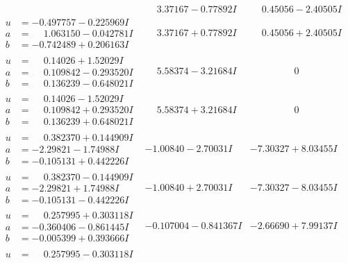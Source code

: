 \documentclass[1p]{elsarticle_modified}
\theoremstyle{definition}
\begin{document}
$$\begin{array}{c|c|c}
 & \phantom{-}3.37167 - 0.77892 I & \phantom{-}0.45056 - 2.40505 I \\ \hline\begin{aligned}
u &= -0.497757 - 0.225969 I \\
a &= \phantom{-}1.063150 - 0.042781 I \\
b &= -0.742489 + 0.206163 I\end{aligned}
 & \phantom{-}3.37167 + 0.77892 I & \phantom{-}0.45056 + 2.40505 I \\ \hline\begin{aligned}
u &= \phantom{-}0.14026 + 1.52029 I \\
a &= \phantom{-}0.109842 - 0.293520 I \\
b &= \phantom{-}0.136239 - 0.648021 I\end{aligned}
 & \phantom{-}5.58374 - 3.21684 I & \phantom{-0.000000 } 0 \\ \hline\begin{aligned}
u &= \phantom{-}0.14026 - 1.52029 I \\
a &= \phantom{-}0.109842 + 0.293520 I \\
b &= \phantom{-}0.136239 + 0.648021 I\end{aligned}
 & \phantom{-}5.58374 + 3.21684 I & \phantom{-0.000000 } 0 \\ \hline\begin{aligned}
u &= \phantom{-}0.382370 + 0.144909 I \\
a &= -2.29821 - 1.74988 I \\
b &= -0.105131 + 0.442226 I\end{aligned}
 & -1.00840 - 2.70031 I & -7.30327 + 8.03455 I \\ \hline\begin{aligned}
u &= \phantom{-}0.382370 - 0.144909 I \\
a &= -2.29821 + 1.74988 I \\
b &= -0.105131 - 0.442226 I\end{aligned}
 & -1.00840 + 2.70031 I & -7.30327 - 8.03455 I \\ \hline\begin{aligned}
u &= \phantom{-}0.257995 + 0.303118 I \\
a &= -0.360406 - 0.861445 I \\
b &= -0.005399 + 0.393666 I\end{aligned}
 & -0.107004 - 0.841367 I & -2.66690 + 7.99137 I \\ \hline\begin{aligned}
u &= \phantom{-}0.257995 - 0.303118 I \\

\end{aligned}
\end{array}$$
\end{document}
